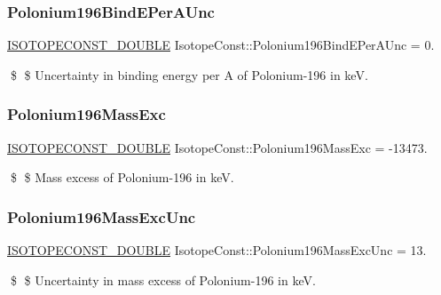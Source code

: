 \subsubsection{\texorpdfstring{Polonium196\+Bind\+E\+Per\+A\+Unc}{Polonium196BindEPerAUnc}}
{\footnotesize\ttfamily \mbox{\hyperlink{group___isotope_const-_macros_ga8f45a7272ce02c0b4c65c44636ed719a}{I\+S\+O\+T\+O\+P\+E\+C\+O\+N\+S\+T\+\_\+\+D\+O\+U\+B\+LE}} Isotope\+Const\+::\+Polonium196\+Bind\+E\+Per\+A\+Unc = 0.}

\$ \$ Uncertainty in binding energy per A of Polonium-\/196 in keV. \mbox{\label{group___isotope_const-_polonium-_po196_gacfd686471a7ea40f5b113e558ce078fb}} 
\subsubsection{\texorpdfstring{Polonium196\+Mass\+Exc}{Polonium196MassExc}}
{\footnotesize\ttfamily \mbox{\hyperlink{group___isotope_const-_macros_ga8f45a7272ce02c0b4c65c44636ed719a}{I\+S\+O\+T\+O\+P\+E\+C\+O\+N\+S\+T\+\_\+\+D\+O\+U\+B\+LE}} Isotope\+Const\+::\+Polonium196\+Mass\+Exc = -\/13473.}

\$ \$ Mass excess of Polonium-\/196 in keV. \mbox{\label{group___isotope_const-_polonium-_po196_ga78fa80368192a75d993e45497dc09d8a}} 
\subsubsection{\texorpdfstring{Polonium196\+Mass\+Exc\+Unc}{Polonium196MassExcUnc}}
{\footnotesize\ttfamily \mbox{\hyperlink{group___isotope_const-_macros_ga8f45a7272ce02c0b4c65c44636ed719a}{I\+S\+O\+T\+O\+P\+E\+C\+O\+N\+S\+T\+\_\+\+D\+O\+U\+B\+LE}} Isotope\+Const\+::\+Polonium196\+Mass\+Exc\+Unc = 13.}

\$ \$ Uncertainty in mass excess of Polonium-\/196 in keV. \mbox{\label{group___isotope_const-_polonium-_po196_ga0f593d8796e5fdf88e9346b19c17b026}} 
